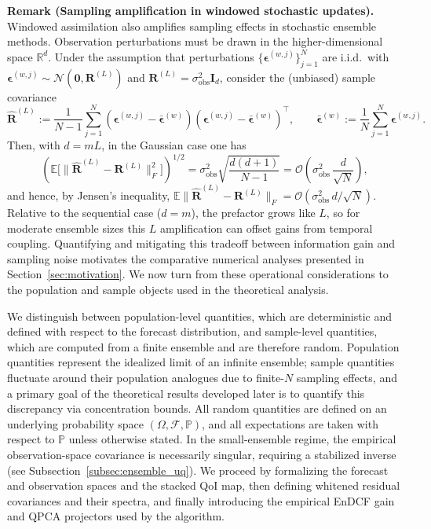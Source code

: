 \documentclass[11pt,a4paper]{article}
\begin{document}
\par\smallskip\noindent\textbf{Remark (Sampling amplification in windowed stochastic updates).}
Windowed assimilation also amplifies sampling effects in stochastic ensemble methods. Observation perturbations must be drawn in the higher-dimensional space $\mathbb{R}^{d}$. Under the assumption that perturbations $\{\boldsymbol{\epsilon}^{(w,j)}\}_{j=1}^N$ are i.i.d.\ with $\boldsymbol{\epsilon}^{(w,j)}\sim\mathcal{N}(\mathbf{0},\mathbf{R}^{(L)})$ and $\mathbf{R}^{(L)}=\sigma_{\mathrm{obs}}^2\mathbf{I}_{d}$, consider the (unbiased) sample covariance
\begin{equation}
\widehat{\mathbf{R}}^{(L)}
:=
\frac{1}{N-1}\sum_{j=1}^N
(\boldsymbol{\epsilon}^{(w,j)}-\bar{\boldsymbol{\epsilon}}^{(w)})
(\boldsymbol{\epsilon}^{(w,j)}-\bar{\boldsymbol{\epsilon}}^{(w)})^\top,
\qquad
\bar{\boldsymbol{\epsilon}}^{(w)}:=\frac{1}{N}\sum_{j=1}^N \boldsymbol{\epsilon}^{(w,j)}.
\end{equation}
Then, with $d=mL$, in the Gaussian case one has
\begin{equation}
\left(\mathbb{E}\bigl[\|\widehat{\mathbf{R}}^{(L)}-\mathbf{R}^{(L)}\|_F^2\bigr]\right)^{1/2}
=
\sigma_{\mathrm{obs}}^2\sqrt{\frac{d(d+1)}{N-1}}
=
\mathcal{O}\!\left(\sigma_{\mathrm{obs}}^2\,\frac{d}{\sqrt{N}}\right),
\end{equation}
and hence, by Jensen's inequality,
$\mathbb{E}\|\widehat{\mathbf{R}}^{(L)}-\mathbf{R}^{(L)}\|_F=\mathcal{O}(\sigma_{\mathrm{obs}}^2\,d/\sqrt{N})$. Relative to the sequential case ($d=m$), the prefactor grows like $L$, so for moderate ensemble sizes this $L$ amplification can offset gains from temporal coupling. Quantifying and mitigating this tradeoff between information gain and sampling noise motivates the comparative numerical analyses presented in Section~\ref{sec:motivation}. We now turn from these operational considerations to the population and sample objects used in the theoretical analysis.



We distinguish between population-level quantities, which are deterministic and defined with respect to the forecast distribution, and sample-level quantities, which are computed from a finite ensemble and are therefore random. Population quantities represent the idealized limit of an infinite ensemble; sample quantities fluctuate around their population analogues due to finite-$N$ sampling effects, and a primary goal of the theoretical results developed later is to quantify this discrepancy via concentration bounds. All random quantities are defined on an underlying probability space $(\Omega,\mathcal{F},\mathbb{P})$, and all expectations are taken with respect to $\mathbb{P}$ unless otherwise stated. In the small-ensemble regime, the empirical observation-space covariance is necessarily singular, requiring a stabilized inverse (see Subsection~\ref{subsec:ensemble_uq}). We proceed by formalizing the forecast and observation spaces and the stacked QoI map, then defining whitened residual covariances and their spectra, and finally introducing the empirical EnDCF gain and QPCA projectors used by the algorithm.
\end{document}
